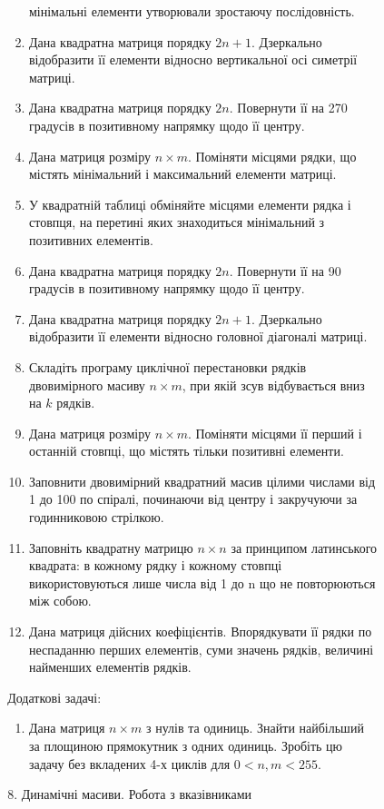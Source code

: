 \documentclass[]{article}
\makeatletter
\newcommand{\xslalph}[1]{\expandafter\@xslalph\csname c@#1\endcsname}
\newcommand{\@xslalph}[1]{%
    \ifcase#1\or а\or б\or в\or г\or д\or e\or є\or ж\or з\or i%
    \or й\or к\or л\or м\or н\or о\or п\or р\or с\or т%
    \or у\or ф\or х\or ц\or ч\or ш\or ю\or я\or аа\or бб\or вв%
    \else\@ctrerr\fi%
}
\makeatother
\begin{document}
\begin{enumerate}
\begin{enumerate}[label=\xslalph*)]
\begin{enumerate}
\begin{enumerate}[label=\xslalph*)]
\begin{enumerate}
  мінімальні елементи утворювали зростаючу послідовність.
\item
  Дана квадратна матриця порядку $2n + 1$. Дзеркально відобразити її
  елементи відносно вертикальної осі симетрії матриці.
\item
  Дана квадратна матриця порядку $2n$. Повернути її на 270 градусів в
  позитивному напрямку щодо її центру.
\item
  Дана матриця розміру $n \times m$. Поміняти місцями рядки, що містять
  мінімальний і максимальний елементи матриці.
\item
  У квадратній таблиці обміняйте місцями елементи рядка і стовпця, на
  перетині яких знаходиться мінімальний з позитивних елементів.
\item
  Дана квадратна матриця порядку $2n$. Повернути її на 90 градусів в
  позитивному напрямку щодо її центру.
\item
  Дана квадратна матриця порядку $2n + 1$. Дзеркально відобразити її
  елементи відносно головної діагоналі матриці.
\item
  Складіть програму циклічної перестановки рядків двовимірного масиву $n \times m$,
  при якій зсув відбувається вниз на $k$ рядків.
\item
  Дана матриця розміру $n \times m$. Поміняти місцями її перший і останній
  стовпці, що містять тільки позитивні елементи.
\item
  Заповнити двовимірний квадратний масив цілими числами від 1 до 100 по
  спіралі, починаючи від центру і закручуючи за годинниковою стрілкою.
\item
  Заповніть квадратну матрицю $n \times n$ за принципом латинського квадрата: в
  кожному рядку і кожному стовпці використовуються лише числа від 1 до n
  що не повторюються між собою.
\item
  Дана матриця дійсних коефіцієнтів. Впорядкувати її рядки по неспаданню
  перших елементів, суми значень рядків, величині найменших елементів
  рядків.
\end{enumerate}

Додаткові задачі:

\begin{enumerate}
\def\labelenumi{\arabic{enumi})}
\item
  Дана матриця $n \times m$ з нулів та одиниць. Знайти найбільший за площиною
  прямокутник з одних одиниць. Зробіть цю задачу без вкладених 4-х
  циклів для $0<n,m<255$.
\end{enumerate}


8. Динамічні масиви. Робота з вказівниками


\end{enumerate}
\end{enumerate}
\end{enumerate}
\end{enumerate}
\end{document}
